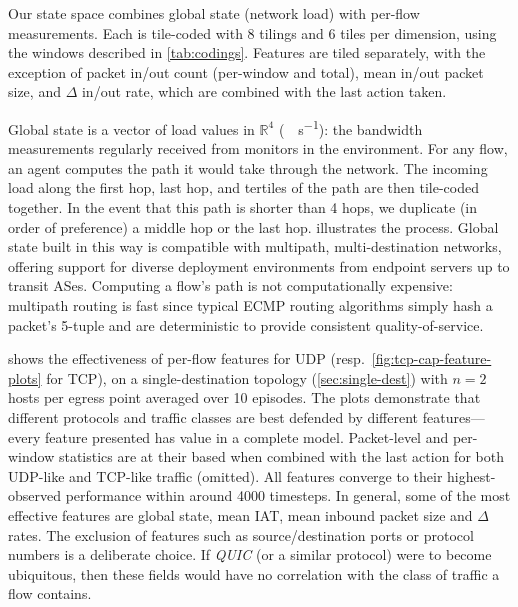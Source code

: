 \documentclass[10pt, times, conference, letterpaper]{IEEEtran}
\begin{document}
Our state space combines global state (network load) with per-flow measurements.
Each is tile-coded with 8 tilings and 6 tiles per dimension, using the windows described in \cref{tab:codings}.
Features are tiled separately, with the exception of packet in/out count (per-window and total), mean in/out packet size, and $\Delta$ in/out rate, which are combined with the last action taken.

Global state is a vector of load values in $\mathbb{R}^4$ (\si{\mega\bit\per\second}): the bandwidth measurements regularly received from monitors in the environment.
For any flow, an agent computes the path it would take through the network.
The incoming load along the first hop, last hop, and tertiles of the path are then tile-coded together.
In the event that this path is shorter than 4 hops, we duplicate (in order of preference) a middle hop or the last hop.
 illustrates the process.
Global state built in this way is compatible with multipath, multi-destination networks, offering support for diverse deployment environments from endpoint servers up to transit ASes.
Computing a flow's path is not computationally expensive: multipath routing is fast since typical ECMP routing algorithms simply hash a packet's 5-tuple and are deterministic to provide consistent quality-of-service.


 shows the effectiveness of per-flow features for UDP (resp.\ \cref{fig:tcp-cap-feature-plots} for TCP), on a single-destination topology (\cref{sec:single-dest}) with $n=2$ hosts per egress point averaged over 10 episodes.
The plots demonstrate that different protocols and traffic classes are best defended by different features---every feature presented has value in a complete model.
Packet-level and per-window statistics are at their based when combined with the last action for both UDP-like and TCP-like traffic (omitted).
All features converge to their highest-observed performance within around \num{4000} timesteps.
In general, some of the most effective features are global state, mean IAT, mean inbound packet size and $\Delta$ rates.
The exclusion of features such as source/destination ports or protocol numbers is a deliberate choice.
If \emph{QUIC} (or a similar protocol) were to become ubiquitous, then these fields would have no correlation with the class of traffic a flow contains.
\end{document}
